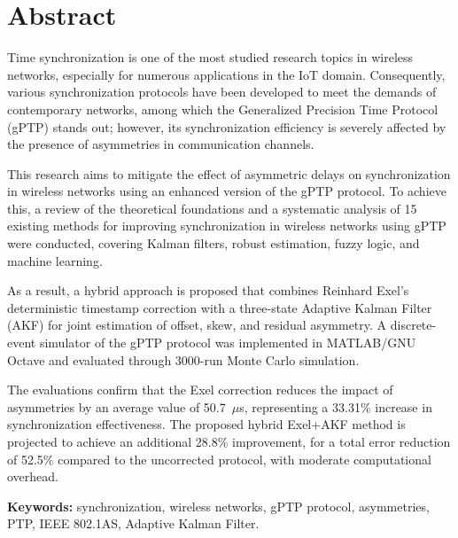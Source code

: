 
\chapter*{Abstract}

Time synchronization is one of the most studied research topics in wireless networks, especially for numerous applications in the IoT domain. Consequently, various synchronization protocols have been developed to meet the demands of contemporary networks, among which the Generalized Precision Time Protocol (gPTP) stands out; however, its synchronization efficiency is severely affected by the presence of asymmetries in communication channels.

This research aims to mitigate the effect of asymmetric delays on synchronization in wireless networks using an enhanced version of the gPTP protocol. To achieve this, a review of the theoretical foundations and a systematic analysis of 15 existing methods for improving synchronization in wireless networks using gPTP were conducted, covering Kalman filters, robust estimation, fuzzy logic, and machine learning.

As a result, a hybrid approach is proposed that combines Reinhard Exel's deterministic timestamp correction with a three-state Adaptive Kalman Filter (AKF) for joint estimation of offset, skew, and residual asymmetry. A discrete-event simulator of the gPTP protocol was implemented in MATLAB/GNU Octave and evaluated through 3000-run Monte Carlo simulation.

The evaluations confirm that the Exel correction reduces the impact of asymmetries by an average value of 50.7~$\mu$s, representing a 33.31\% increase in synchronization effectiveness. The proposed hybrid Exel+AKF method is projected to achieve an additional 28.8\% improvement, for a total error reduction of 52.5\% compared to the uncorrected protocol, with moderate computational overhead.

\vspace{1cm}
\noindent\textbf{Keywords:} synchronization, wireless networks, gPTP protocol, asymmetries, PTP, IEEE 802.1AS, Adaptive Kalman Filter.
